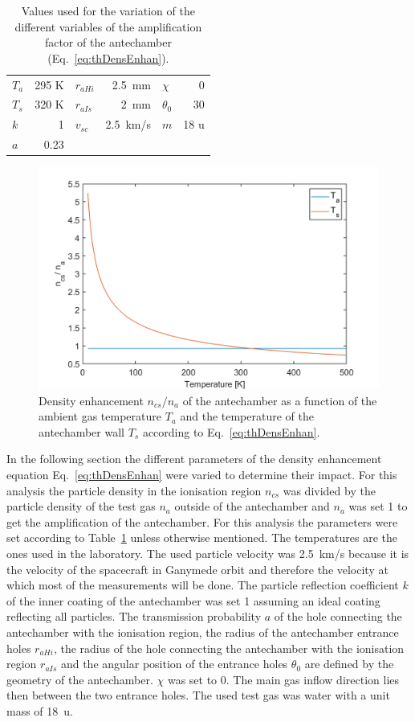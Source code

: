 	\begin{table}[h]
		\begin{center}
			\begin{tabular}{|l r |l r |l r|}
				\hline
				$T_a$ 	& 295 K	& $r_{aHi}$	& 2.5~mm	& $\chi$	& 0\degree \\
				$T_s$ 	& 320 K & $r_{aIs}$ & 2~mm	& $\theta_0$& 30\degree\\	
				$k$		&	1	& $v_{sc}$	& 2.5~km/s& $m$		& 18 u\\
				$a$		& 0.23	&			&			&			&	\\
				\hline
			\end{tabular}
		\end{center}
		\caption{Values used for the variation of the different variables of the amplification factor of the antechamber (Eq.~\eqref{eq:thDensEnhan}).}
		\label{tab:thDensEnhan}
	\end{table}
	\begin{figure}[h!] %
		\centering
		\includegraphics[width= .7\textwidth]{Bilder/Ta_Ts.png}
		\caption{Density enhancement $n_{cs}/n_a$ of the antechamber as a function of the ambient gas temperature $T_a$ and the temperature of the antechamber wall $T_s$ according to Eq.~\eqref{eq:thDensEnhan}.}
		\label{th:densEnhTaTs}
	\end{figure}
	In the following section the different parameters of the density enhancement equation Eq.~\eqref{eq:thDensEnhan} were varied to determine their impact. For this analysis the particle density in the ionisation region $n_{cs}$ was divided by the particle density of the test gas $n_a$ outside of the antechamber and $n_a$ was set 1 to get the amplification of the antechamber. For this analysis the parameters were set according to Table~\ref{tab:thDensEnhan} unless otherwise mentioned. The temperatures are the ones used in the laboratory. The used particle velocity was 2.5~km/s because it is the velocity of the spacecraft in Ganymede orbit and therefore the velocity at which most of the measurements will be done. The particle reflection coefficient $k$ of the inner coating of the antechamber was set 1 assuming an ideal coating reflecting all particles. The transmission probability $a$ of the hole connecting the antechamber with the ionisation region, the radius of the antechamber entrance holes $r_{aHi}$, the radius of the hole connecting the antechamber with the ionisation region $r_{aIs}$ and the angular position of the entrance holes $\theta_0$ are defined by the geometry of the antechamber. $\chi$ was set to 0\degree. The main gas inflow direction lies then between the two entrance holes. The used test gas was water with a unit mass of 18~u.\\ %
